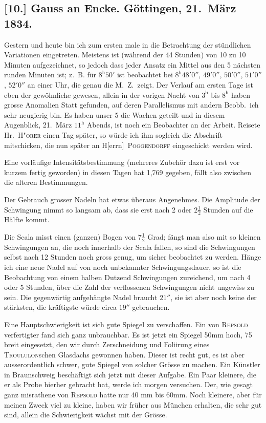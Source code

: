 \documentclass[12pt,a4paper]{article}
\begin{document}
\subsection*{[10.] Gauss an Encke. G\"ottingen, 21.~M\"arz 1834.}

Gestern und heute bin ich zum ersten male in die Betrachtung der st\"undlichen Variationen eingetreten. Meistens ist (w\"ahrend der 44 Stunden) von 10 zu 10 Minuten aufgezeichnet, so jedoch dass jeder Ansatz ein Mittel aus den 5 n\"achsten runden Minuten ist; z.~B. f\"ur $8^{\mathrm{h}} 50'$ ist beobachtet bei $8^{\mathrm{h}} 48' 0''$, $49' 0''$, $50' 0''$, $51' 0''$, $52' 0''$ an einer Uhr, die genau die M.~Z.~zeigt. Der Verlauf am ersten Tage ist eben der gew\"ohnliche gewesen, allein in der vorigen Nacht von $3^{\mathrm{h}}$ bis $8^{\mathrm{h}}$ haben grosse Anomalien Statt gefunden, auf deren Parallelismus mit andern Beobb.~ich sehr neugierig bin. Es haben unser 5 die Wachen geteilt und in diesem Augenblick, 21.~M\"arz $11^{\mathrm{h}}$ Abends, ist noch ein Beobachter an der Arbeit. Reisete Hr.~\textsc{H"orer} einen Tag sp\"ater, so w\"urde ich ihm sogleich die Abschrift mitschicken, die nun sp\"ater an H[errn]~\textsc{Poggendorff} eingeschickt werden wird.

Eine vorl\"aufige Intensit\"atsbestimmung (mehreres Zubeh\"or dazu ist erst vor kurzem fertig geworden) in diesen Tagen hat 1,769 gegeben, f\"allt also zwischen die alteren Bestimmungen.

Der Gebrauch grosser Nadeln hat etwas \"uberaus Angenehmes. Die Amplitude der Schwingung nimmt so langsam ab, dass sie erst nach 2 oder $2\frac12$ Stunden auf die H\"alfte kommt.

Die Scala misst einen (ganzen) Bogen von $7\frac12$ Grad; f\"angt man also mit so kleinen Schwingungen an, die noch innerhalb der Scala fallen, so sind die Schwingungen selbst nach 12 Stunden noch gross genug, um sicher beobachtet zu werden. H\"ange ich eine neue Nadel auf von noch unbekannter Schwingungsdauer, so ist die Beobachtung von einem halben Dutzend Schwingungen zureichend, um nach 4 oder 5 Stunden, \"uber die Zahl der verflossenen Schwingungen nicht ungewiss zu sein. Die gegenw\"artig aufgeh\"angte Nadel braucht $21''$, sie ist aber noch keine der st\"arksten, die kr\"aftigste w\"urde circa $19''$ gebrauchen.

Eine Hauptschwierigkeit ist sich gute Spiegel zu verschaffen. Ein von \textsc{Repsold} verfertigter fand sich ganz unbrauchbar. Es ist jetzt ein Spiegel 50mm hoch, 75 breit eingesetzt, den wir durch Zerschneidung und Foliirung eines \textsc{Troululon}schen Glasdachs gewonnen haben. Dieser ist recht gut, es ist aber ausserordentlich schwer, gute Spiegel von solcher Gr\"osse zu machen. Ein K\"unstler in Braunschweig besch\"aftigt sich jetzt mit dieser Aufgabe. Ein Paar kleinere, die er als Probe hierher gebracht hat, werde ich morgen versuchen. Der, wie gesagt ganz misrathene von \textsc{Repsold} hatte nur 40 mm bis 60mm. Noch kleinere, aber f\"ur meinen Zweck viel zu kleine, haben wir fr\"uher aus M\"unchen erhalten, die sehr gut sind, allein die Schwierigkeit w\"achst mit der Gr\"osse.\dotfill
\end{document}

